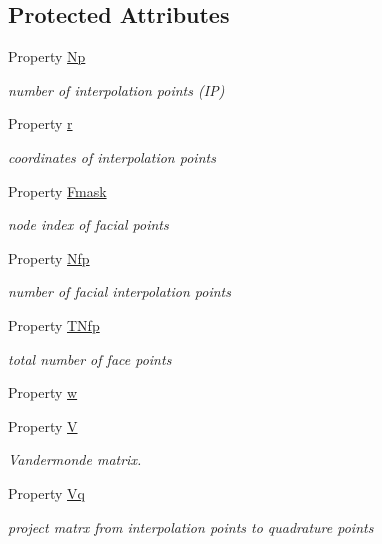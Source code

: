 \subsection*{Protected Attributes}
\begin{DoxyCompactItemize}
\item 
Property \hyperlink{class_std_cell_a161d8f82735498acb15f198624595737}{Np}
\begin{DoxyCompactList}\small\item\em number of interpolation points (IP) \end{DoxyCompactList}\item 
Property \hyperlink{class_std_cell_a737dd2feb25f74be0215a594334ec622}{r}
\begin{DoxyCompactList}\small\item\em coordinates of interpolation points \end{DoxyCompactList}\item 
Property \hyperlink{class_std_cell_aed7a2e88c548b37a49916bd994e603fe}{Fmask}
\begin{DoxyCompactList}\small\item\em node index of facial points \end{DoxyCompactList}\item 
Property \hyperlink{class_std_cell_ae3f5999a32fa305191bfe5f95d076b14}{Nfp}
\begin{DoxyCompactList}\small\item\em number of facial interpolation points \end{DoxyCompactList}\item 
Property \hyperlink{class_std_cell_a6a0f137c9f2cbdb072f971ddc539648a}{T\+Nfp}
\begin{DoxyCompactList}\small\item\em total number of face points \end{DoxyCompactList}\item 
Property \hyperlink{class_std_cell_aa3fb1019badb7a9eee7e2d99df715f4d}{w}
\item 
Property \hyperlink{class_std_cell_a042ef905a2ea97d9ef6cf5d5a989d5af}{V}
\begin{DoxyCompactList}\small\item\em Vandermonde matrix. \end{DoxyCompactList}\item 
Property \hyperlink{class_std_cell_a0d754a8782af3ef3f1f8a974145282bf}{Vq}
\begin{DoxyCompactList}\small\item\em project matrx from interpolation points to quadrature points \end{DoxyCompactList}\item 

\end{DoxyCompactItemize}
